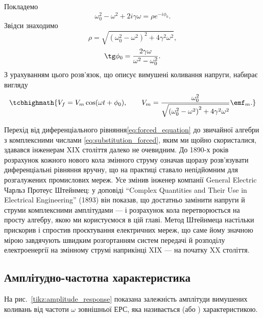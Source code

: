Покладемо
\begin{equation}\label{eq:polar_form}
	\omega_0^2 - \omega^2 + 2i\gamma\omega = \rho e^{-i\phi_0}.
\end{equation}
Звідси знаходимо
\begin{equation}\label{eq:rho_phi}
	\rho = \sqrt{\left(\omega_0^2 - \omega^2\right)^2 + 4\gamma^2\omega^2},
\end{equation}
\begin{equation}\label{eq:tg_phi0}
	\tg\phi_0 = \frac{2\gamma\omega}{\omega^2 - \omega_0^2}.
\end{equation}
З урахуванням цього розв'язок, що описує вимушені коливання напруги, набирає вигляду
\begin{equation}\label{eq:forced_voltage}
	\tcbhighmath{
		V_f = V_m \cos(\omega t + \phi_0), \qquad
		V_m = \frac{\omega_0^2}{\sqrt{\left(\omega_0^2 - \omega^2\right)^2 + 4\gamma^2\omega^2}}\emf_m.
	}
\end{equation}

\begin{Historical}
	Перехід від диференціального рівняння\eqref{eq:forced_equation} до звичайної алгебри з комплексними числами \eqref{eq:substitution_forced}, яким ми щойно скористалися, здавався інженерам XIX століття далеко не очевидним. До 1890-х років розрахунок кожного нового кола змінного струму означав щоразу розв'язувати диференціальні рівняння вручну, що на практиці ставало непідйомним для розгалужених промислових мереж. Усе змінив інженер компанії General Electric Чарльз Протеус Штейнмец: у доповіді \enquote{Complex Quantities and Their Use in Electrical Engineering} (1893) він показав, що достатньо замінити напруги й струми комплексними амплітудами --- і розрахунок кола перетворюється на просту алгебру, якою ми користуємося в цій главі. Метод Штейнмеца настільки прискорив і спростив проєктування електричних мереж, що саме йому значною мірою завдячують швидким розгортанням систем передачі й розподілу електроенергії на змінному струмі наприкінці XIX --- на початку XX століття.
\end{Historical}

\subsection*{Амплітудно-частотна характеристика}

На рис.~\ref{tikz:amplitude_response} показана залежність амплітуди вимушених коливань від частоти $\omega$ зовнішньої ЕРС, яка називається  (або ) характеристикою.

